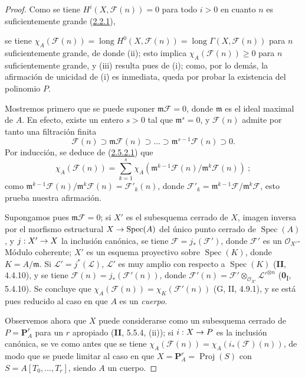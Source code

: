 \documentclass[10pt,oneside,openany]{book}
\theoremstyle{egaenv}\newtheorem*{env}{---}
\theoremstyle{egastatement}
\theoremstyle{egadescription}
\newcommand{\oldpage}[2][]{\marginnote{\normalfont\scriptsize\textbf{#1}\,|\,#2}\ignorespaces}
\renewcommand{\geq}{\geqslant}
\renewcommand{\to}{\mathchoice{\longrightarrow}{\rightarrow}{\rightarrow}{\rightarrow}}
\begin{document}
\begin{proof}
Como se tiene $H^i(X,\mathcal F(n))=0$ para todo $i>0$ en cuanto $n$ es
suficientemente grande (\hyperref[III.2.2.1-fr]{2.2.1}),

\oldpage[III]{110}
se tiene
$\chi_A(\mathcal F(n))=\operatorname{long}H^0(X,\mathcal F(n))
=\operatorname{long}\Gamma(X,\mathcal F(n))$
para $n$ suficientemente grande, de donde (ii); esto implica
$\chi_A(\mathcal F(n))\geq0$ para $n$ suficientemente grande, y (iii) resulta pues
de (i); como, por lo demás, la afirmación de unicidad de (i) es inmediata,
queda por probar la existencia del polinomio $P$.

Mostremos primero que se puede suponer $\mathfrak m\mathcal F=0$, donde
$\mathfrak m$ es el ideal maximal de $A$. En efecto, existe un entero
$s>0$ tal que $\mathfrak m^s=0$, y $\mathcal F(n)$ admite por tanto una
filtración finita
\[
\mathcal F(n)\supset\mathfrak m\mathcal F(n)\supset\ldots
\supset\mathfrak m^{s-1}\mathcal F(n)\supset0.
\]
Por inducción, se deduce de
(\hyperref[III.2.5.2.1-fr]{2.5.2.1}) que
\[
\chi_A(\mathcal F(n))=\sum_{k=1}^{s}
\chi_A(\mathfrak m^{k-1}\mathcal F(n)/\mathfrak m^k\mathcal F(n))~;
\]
como
$\mathfrak m^{k-1}\mathcal F(n)/\mathfrak m^k\mathcal F(n)
=\mathcal F'_k(n)$, donde
$\mathcal F'_k=\mathfrak m^{k-1}\mathcal F/\mathfrak m^k\mathcal F$,
esto prueba nuestra afirmación.

Supongamos pues $\mathfrak m\mathcal F=0$; si $X'$ es el subesquema
cerrado de $X$, imagen inversa por el morfismo estructural
$X\to\operatorname{Spec}(A)$ del único punto cerrado de
$\operatorname{Spec}(A)$, y $j:X'\to X$ la inclusión canónica, se tiene
$\mathcal F=j_*(\mathcal F')$, donde $\mathcal F'$ es un
$\mathcal O_{X'}$-Módulo coherente; $X'$ es un esquema proyectivo sobre
$\operatorname{Spec}(K)$, donde $K=A/\mathfrak m$. Si
$\mathcal L'=j^*(\mathcal L)$, $\mathcal L'$ es muy amplio con respecto
a $\operatorname{Spec}(K)$ (\textbf{II}, 4.4.10), y se tiene
$\mathcal F(n)=j_*(\mathcal F'(n))$, donde
$\mathcal F'(n)=\mathcal F'\otimes_{\mathcal O_{X'}}
\mathcal L'^{\otimes n}$ (\textbf{0}\textsubscript{I}, 5.4.10). Se concluye que
$\chi_A(\mathcal F(n))=\chi_K(\mathcal F'(n))$ (G, II, 4.9.1), y se está
pues reducido al caso en que $A$ es un \emph{cuerpo}.

Observemos ahora que $X$ puede considerarse como un subesquema
cerrado de $P=\mathbf P_A^r$ para un $r$ apropiado (\textbf{II}, 5.5.4, (ii));
si $i:X\to P$ es la inclusión canónica, se ve como antes que se
tiene $\chi_A(\mathcal F(n))=\chi_A(i_*(\mathcal F)(n))$, de modo que se
puede limitar al caso en que $X=\mathbf P_A^r=\operatorname{Proj}(S)$ con
$S=A[T_0,\ldots,T_r]$, siendo $A$ un cuerpo.


\end{proof}
\end{document}
